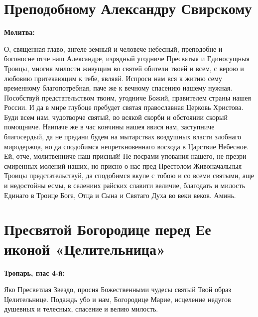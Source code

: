  

\section{Преподобному Александру Свирскому}
 
\bfseries Молитва:\normalfont{}


О, священная главо, ангеле земный и человече небесный, преподобне и богоносне отче наш Александре, изрядный угодниче Пресвятыя и Единосущныя Троицы, многия милости живущим во святей обители твоей и всем, с верою и любовию притекающим к тебе, являяй. Испроси нам вся к житию сему временному благопотребная, паче же к вечному спасению нашему нужная. Пособствуй предстательством твоим, угодниче Божий, правителем страны нашея России. И да в мире глубоце пребудет святая православная Церковь Христова. Буди всем нам, чудотворче святый, во всякой скорби и обстоянии скорый помощниче. Наипаче же в час кончины нашея явися нам, заступниче благосердый, да не предани будем на мытарствах воздушных власти злобнаго миродержца, но да сподобимся непреткновеннаго восхода в Царствие Небесное. Ей, отче, молитвенниче наш присный! Не посрами упования нашего, не презри смиренных молений наших, но присно о нас пред Престолом Живоначальныя Троицы предстательствуй, да сподобимся вкупе с тобою и со всеми святыми, аще и недостойны есмы, в селениих райских славити величие, благодать и милость Единаго в Троице Бога, Отца и Сына и Святаго Духа во веки веков. Аминь.\mychapterending


 

\section{Пресвятой Богородице перед Ее иконой «Целительница»}
 

\bfseries Тропарь, глас 4-й:\normalfont{}\nopagebreak


Яко Пресветлая Звездо, просия Божественными чудесы святый Твой образ Целительнице. Подаждь убо и нам, Богородице Марие, исцеление недугов душевных и телесных, спасение и велию милость.


\medskip



